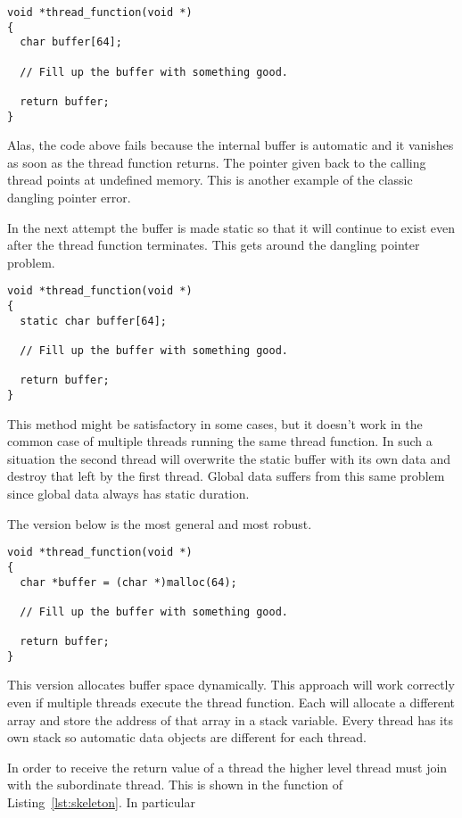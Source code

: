 \begin{lstlisting}
void *thread_function(void *)
{
  char buffer[64];

  // Fill up the buffer with something good.

  return buffer;
}
\end{lstlisting}

Alas, the code above fails because the internal buffer is automatic and it vanishes as soon as
the thread function returns. The pointer given back to the calling thread points at undefined
memory. This is another example of the classic dangling pointer error.

In the next attempt the buffer is made static so that it will continue to exist even after the
thread function terminates. This gets around the dangling pointer problem.

\begin{lstlisting}
void *thread_function(void *)
{
  static char buffer[64];

  // Fill up the buffer with something good.

  return buffer;
}
\end{lstlisting}

This method might be satisfactory in some cases, but it doesn't work in the common case of
multiple threads running the same thread function. In such a situation the second thread will
overwrite the static buffer with its own data and destroy that left by the first thread. Global
data suffers from this same problem since global data always has static duration.

The version below is the most general and most robust.

\begin{lstlisting}
void *thread_function(void *)
{
  char *buffer = (char *)malloc(64);

  // Fill up the buffer with something good.

  return buffer;
}
\end{lstlisting}

This version allocates buffer space dynamically. This approach will work correctly even if
multiple threads execute the thread function. Each will allocate a different array and store the
address of that array in a stack variable. Every thread has its own stack so automatic data
objects are different for each thread.

In order to receive the return value of a thread the higher level thread must join with the
subordinate thread. This is shown in the  function of Listing~\ref{lst:skeleton}.
In particular

